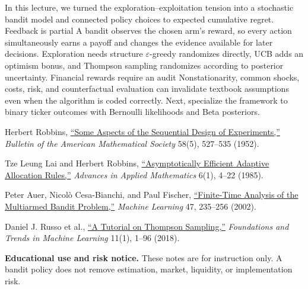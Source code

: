 \documentclass[11pt]{article}
\begin{document}
\keytakeaways
  {In this lecture, we turned the exploration--exploitation tension into a stochastic bandit model and connected policy choices to expected cumulative regret.}
  {Feedback is partial}
  {A bandit observes the chosen arm's reward, so every action simultaneously earns a payoff and changes the evidence available for later decisions.}
  {Exploration needs structure}
  {$\varepsilon$-greedy randomizes directly, UCB adds an optimism bonus, and Thompson sampling randomizes according to posterior uncertainty.}
  {Financial rewards require an audit}
  {Nonstationarity, common shocks, costs, risk, and counterfactual evaluation can invalidate textbook assumptions even when the algorithm is coded correctly.}
  {Next, specialize the framework to binary ticker outcomes with Bernoulli likelihoods and Beta posteriors.}

\begin{readinglist}
  \item Herbert Robbins, \href{https://doi.org/10.1007/978-1-4612-5110-1_26}{``Some Aspects of the Sequential Design of Experiments,''} \emph{Bulletin of the American Mathematical Society} 58(5), 527--535 (1952).
  \item Tze Leung Lai and Herbert Robbins, \href{https://doi.org/10.1016/0196-8858(85)90002-8}{``Asymptotically Efficient Adaptive Allocation Rules,''} \emph{Advances in Applied Mathematics} 6(1), 4--22 (1985).
  \item Peter Auer, Nicol\`o Cesa-Bianchi, and Paul Fischer, \href{https://doi.org/10.1023/A:1013689704352}{``Finite-Time Analysis of the Multiarmed Bandit Problem,''} \emph{Machine Learning} 47, 235--256 (2002).
  \item Daniel J. Russo et al., \href{https://doi.org/10.1561/2200000070}{``A Tutorial on Thompson Sampling,''} \emph{Foundations and Trends in Machine Learning} 11(1), 1--96 (2018).
\end{readinglist}

\vfill
{\sffamily\footnotesize\color{vnmuted}\textbf{Educational use and risk notice.} These notes are for instruction only. A bandit policy does not remove estimation, market, liquidity, or implementation risk.}
\end{document}

